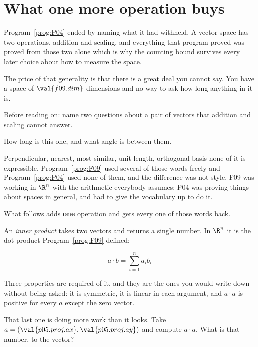 \section{What one more operation buys}
\label{sec:P05-inner}

\begin{fr}
Program~\ref{prog:P04} ended by naming what it had withheld. A vector space has
two operations, addition and scaling, and everything that program proved was
proved from those two alone \dash{} which is why the counting bound survives
every later choice about how to measure the space.

The price of that generality is that there is a great deal you cannot say. You
have a space of $\val{f09.dim}$ dimensions and no way to ask how long
anything in it is.

Before reading on: name two questions about a pair of vectors that addition and
scaling cannot answer.
\nextframe
\end{fr}

\begin{fr}
\begin{ansblock}
How long is this one, and what angle is between them.
\end{ansblock}

Perpendicular, nearest, most similar, unit length, orthogonal basis \dash{} none
of it is expressible. Program~\ref{prog:F09} used several of those words freely
and Program~\ref{prog:P04} used none of them, and the difference was not style.
F09 was working in $\R^{n}$ with the arithmetic everybody assumes; P04 was
proving things about spaces in general, and had to give the vocabulary up to do
it.

What follows adds \textbf{one} operation and gets every one of those words back.
\end{fr}

\begin{fr}
An \emph{inner product} takes two vectors and returns a single number. In
$\R^{n}$ it is the dot product Program~\ref{prog:F09} defined:

\[ a \cdot b = \sum_{i=1}^{n} a_i b_i \]

Three properties are required of it, and they are the ones you would write down
without being asked: it is symmetric, it is linear in each argument, and
$a \cdot a$ is positive for every $a$ except the zero vector.

That last one is doing more work than it looks. Take
$a = (\val{p05.proj.ax}, \val{p05.proj.ay})$ and compute $a \cdot a$. What is
that number, to the vector?
\nextframe
\end{fr}


